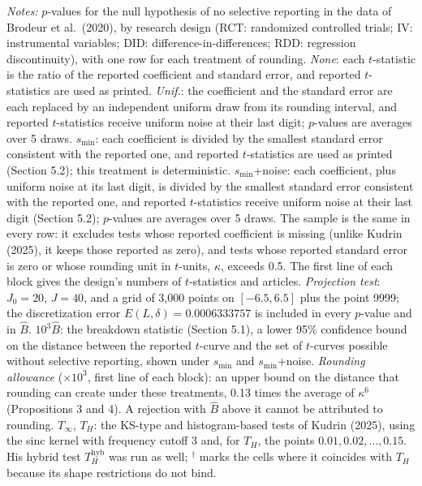 \begin{table}[htbp]
\medskip
\begin{minipage}{\linewidth}
\footnotesize
\textit{Notes:} $p$-values for the null hypothesis of no selective reporting in the data of Brodeur et al.\ (2020), by research design (RCT: randomized controlled trials; IV: instrumental variables; DID: difference-in-differences; RDD: regression discontinuity), with one row for each treatment of rounding.
\textit{None}: each $t$-statistic is the ratio of the reported coefficient and standard error, and reported $t$-statistics are used as printed.
\textit{Unif.}: the coefficient and the standard error are each replaced by an independent uniform draw from its rounding interval, and reported $t$-statistics receive uniform noise at their last digit; $p$-values are averages over 5 draws.
$s_{\min}$: each coefficient is divided by the smallest standard error consistent with the reported one, and reported $t$-statistics are used as printed (Section 5.2); this treatment is deterministic.
$s_{\min}$+noise: each coefficient, plus uniform noise at its last digit, is divided by the smallest standard error consistent with the reported one, and reported $t$-statistics receive uniform noise at their last digit (Section 5.2); $p$-values are averages over 5 draws.
The sample is the same in every row: it excludes tests whose reported coefficient is missing (unlike Kudrin (2025), it keeps those reported as zero), and tests whose reported standard error is zero or whose rounding unit in $t$-units, $\kappa$, exceeds 0.5. The first line of each block gives the design's numbers of $t$-statistics and articles.
\textit{Projection test}: $J_0=20$, $J=40$, and a grid of 3,000 points on $[-6.5,6.5]$ plus the point 9999; the discretization error $E(L,\delta)=0.0006333757$ is included in every $p$-value and in $\widehat{B}$.
$10^3\widehat{B}$: the breakdown statistic (Section 5.1), a lower 95\% confidence bound on the distance between the reported $t$-curve and the set of $t$-curves possible without selective reporting, shown under $s_{\min}$ and $s_{\min}$+noise. \textit{Rounding allowance} ($\times 10^3$, first line of each block): an upper bound on the distance that rounding can create under these treatments, 0.13 times the average of $\kappa^6$ (Propositions 3 and 4). A rejection with $\widehat{B}$ above it cannot be attributed to rounding.
$T_\infty$, $T_H$: the KS-type and histogram-based tests of Kudrin (2025), using the sinc kernel with frequency cutoff 3 and, for $T_H$, the points $0.01,0.02,\ldots,0.15$. His hybrid test $T_H^{\mathrm{hyb}}$ was run as well; $^\dagger$ marks the cells where it coincides with $T_H$ because its shape restrictions do not bind.

\end{minipage}
\end{table}
